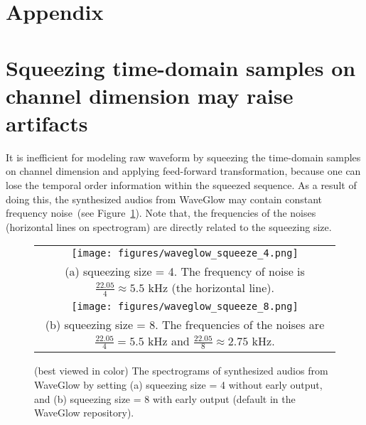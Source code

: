 \documentclass{article}
\begin{document}
\nocite{wang2019neural}







\onecolumn


\appendix

\section*{{\Large Appendix}}

\section{Squeezing time-domain samples on channel dimension may raise artifacts}
\label{appendix:waveglow_noise}
It is inefficient for modeling raw waveform by squeezing the time-domain samples on channel dimension and applying feed-forward transformation, because one can lose the temporal order information within the squeezed sequence.
As a result of doing this, the synthesized audios from WaveGlow may contain constant frequency noise~(see Figure~\ref{fig:waveglow_noise}).
Note that, the frequencies of the noises (horizontal lines on spectrogram) are directly related to the squeezing size.  


\begin{figure}[h] \centering
\begin{tabular}{c}
\hspace{-.3cm}
\texttt{[image: figures/waveglow\_squeeze\_4.png]} 
\\
{\small (a) squeezing size = 4. The frequency of noise is $\frac{22.05}{4} \approx 5.5$ kHz (the horizontal line).}
\vspace{0.2cm}
\\
\hspace{-.3cm}
\texttt{[image: figures/waveglow\_squeeze\_8.png]} 
\\
{\small (b) squeezing size = 8. The frequencies of the noises are $\frac{22.05}{4}=5.5$ kHz and $\frac{22.05}{8}\approx 2.75$ kHz.}
\vspace{-.5em}
\\
\end{tabular}
\vspace{0.2em}
\caption{(best viewed in color) The spectrograms of synthesized audios from WaveGlow by setting (a) squeezing size = 4 without early output, and (b) squeezing size = 8 with early output (default in the WaveGlow repository).}
\label{fig:waveglow_noise} \end{figure}
\end{document}

